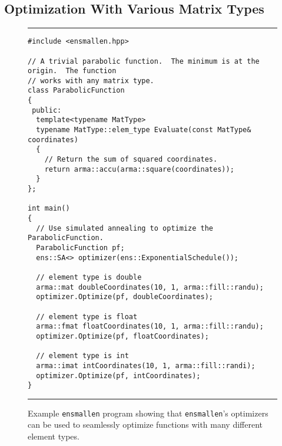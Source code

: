 \subsection{Optimization With Various Matrix Types}
\label{sec:templated_optimize}


\begin{figure}[b!]
\hrule
\vspace{1ex}
\begin{verbatim}
#include <ensmallen.hpp>

// A trivial parabolic function.  The minimum is at the origin.  The function
// works with any matrix type.
class ParabolicFunction
{
 public:
  template<typename MatType>
  typename MatType::elem_type Evaluate(const MatType& coordinates)
  {
    // Return the sum of squared coordinates.
    return arma::accu(arma::square(coordinates));
  }
};

int main()
{
  // Use simulated annealing to optimize the ParabolicFunction.
  ParabolicFunction pf;
  ens::SA<> optimizer(ens::ExponentialSchedule());

  // element type is double
  arma::mat doubleCoordinates(10, 1, arma::fill::randu);
  optimizer.Optimize(pf, doubleCoordinates);

  // element type is float
  arma::fmat floatCoordinates(10, 1, arma::fill::randu);
  optimizer.Optimize(pf, floatCoordinates);

  // element type is int
  arma::imat intCoordinates(10, 1, arma::fill::randi);
  optimizer.Optimize(pf, intCoordinates);
}
\end{verbatim}
\hrule
\vspace*{-0.5em}
\caption{Example {\tt ensmallen} program showing that {\tt ensmallen}'s
optimizers can be used to seamlessly optimize functions with many different
element types.}
\label{fig:many_optimize}
\end{figure}

